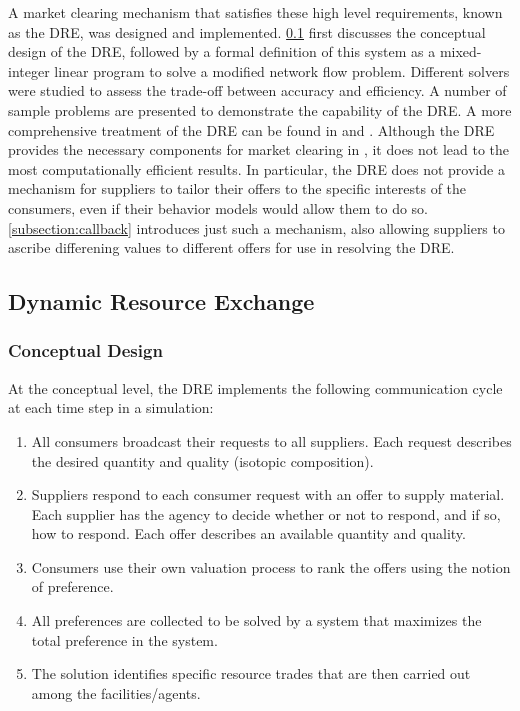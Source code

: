 A market clearing mechanism that satisfies these high level requirements,
known as the \gls{DRE}, was designed and implemented.  \ref{subsection:dre}
first discusses the conceptual design of the \gls{DRE}, followed by a formal
definition of this system as a mixed-integer linear program to solve a
modified network flow problem.  Different solvers were studied to assess the
trade-off between accuracy and efficiency.  A number of sample problems are
presented to demonstrate the capability of the \gls{DRE}.  A more
comprehensive treatment of the \gls{DRE} can be found in \cite{dre_paper}
and \cite{gidden_thesis}.  Although the \gls{DRE} provides the necessary
components for market clearing in \Cyclus, it does not lead to the most
computationally efficient results.  In particular, the \gls{DRE} does not
provide a mechanism for suppliers to tailor their offers to the specific
interests of the consumers, even if their behavior models would allow them to
do so.  \ref{subsection:callback} introduces just such a mechanism, also
allowing suppliers to ascribe differening values to different offers for use
in resolving the \gls{DRE}.

\subsection{Dynamic Resource Exchange}\label{subsection:dre}

\subsubsection{Conceptual Design}

At the conceptual level, the \gls{DRE} implements the following communication
cycle at each time step in a \Cyclus simulation:
\begin{enumerate}
\item All consumers broadcast their requests to all suppliers.  Each request
  describes the desired quantity and quality (isotopic composition).
\item Suppliers respond to each consumer request with an offer to supply
  material.  Each supplier has the agency to decide whether or not to respond,
  and if so, how to respond.  Each offer describes an available quantity and
  quality.
\item Consumers use their own valuation process to rank the offers using the
  notion of preference.
\item All preferences are collected to be solved by a system that maximizes
  the total preference in the system.
\item The solution identifies specific resource trades that are then carried
  out among the facilities/agents.
\end{enumerate}

